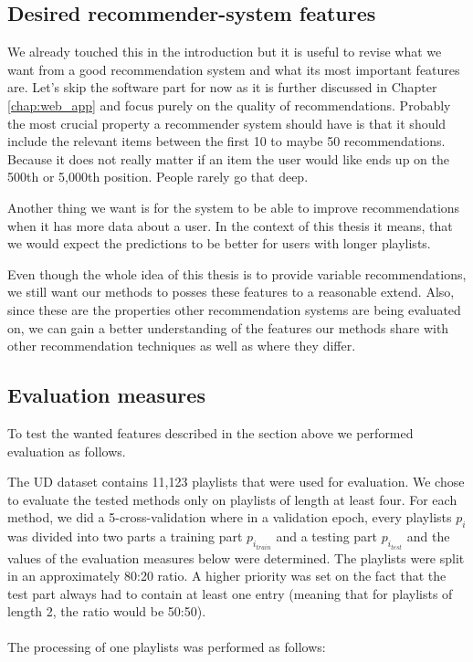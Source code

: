 \subsection{Desired recommender-system features}
We already touched this in the introduction but it is useful to revise what we want from a good recommendation system and what its most important features are. Let's skip the software part for now as it is further discussed in Chapter \ref{chap:web_app} and focus purely on the quality of recommendations. Probably the most crucial property a recommender system should have is that it should include the relevant items between the first 10 to maybe 50 recommendations. Because it does not really matter if an item the user would like ends up on the 500th or 5,000th position. People rarely go that deep. 

Another thing we want is for the system to be able to improve recommendations when it has more data about a user. In the context of this thesis it means, that we would expect the predictions to be better for users with longer playlists. 

Even though the whole idea of this thesis is to provide variable recommendations, we still want our methods to posses these features to a reasonable extend. Also, since these are the properties other recommendation systems are being evaluated on, we can gain a better understanding of the features our methods share with other recommendation techniques as well as where they differ. 

\subsection{Evaluation measures}\label{ssec:evaluation_measures}
To test the wanted features described in the section above we performed evaluation as follows. 

The UD dataset contains 11,123 playlists that were used for evaluation. We chose to evaluate the tested methods only on playlists of length at least four. For each method, we did a 5-cross-validation where in a validation epoch, every playlists $p_i$ was divided into two parts a training part $p_{i_{train}}$ and a testing part $p_{i_{test}}$ and the values of the evaluation measures below were determined. The playlists were split in an approximately 80:20 ratio. A higher priority was set on the fact that the test part always had to contain at least one entry (meaning that for playlists of length 2, the ratio would be 50:50). \\ \\
The processing of one playlists was performed as follows: 


